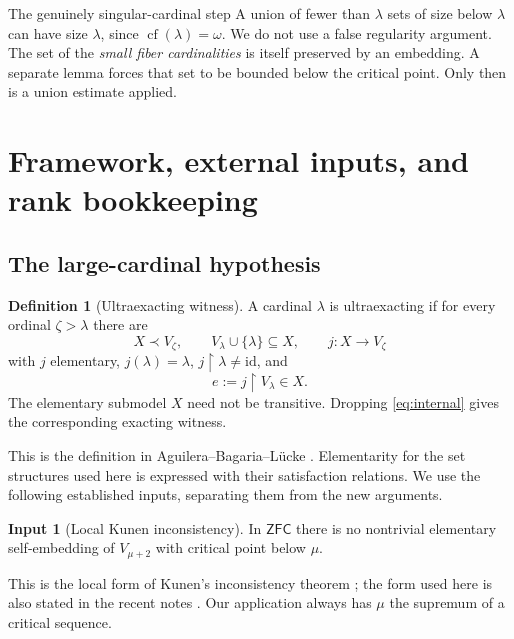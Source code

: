 \documentclass[11pt,letterpaper]{article}
\theoremstyle{definition}
\newtheorem{definition}{Definition}[section]
\newtheorem{inputthm}{Input}
\numberwithin{equation}{section}
\newcommand{\ZFC}{\mathsf{ZFC}}
\newcommand{\cf}{\operatorname{cf}}
\newcommand{\id}{\mathrm{id}}
\newcommand{\restr}{\mathbin{\upharpoonright}}
\begin{document}
\begin{assessment}{The genuinely singular-cardinal step}
A union of fewer than $\lambda$ sets of size below $\lambda$ can have size $\lambda$, since $\cf(\lambda)=\omega$. We do not use a false regularity argument. The set of the \emph{small fiber cardinalities} is itself preserved by an embedding. A separate lemma forces that set to be bounded below the critical point. Only then is a union estimate applied.
\end{assessment}

\section{Framework, external inputs, and rank bookkeeping}\label{sec:framework}

\subsection{The large-cardinal hypothesis}

\begin{definition}[Ultraexacting witness]\label{def:ultra}
A cardinal $\lambda$ is ultraexacting if for every ordinal $\zeta>\lambda$ there are
\[
 X\prec V_\zeta,\qquad V_\lambda\cup\{\lambda\}\subseteq X,
 \qquad j:X\longrightarrow V_\zeta
\]
with $j$ elementary, $j(\lambda)=\lambda$, $j\restr\lambda\ne\id$, and
\begin{equation}\label{eq:internal}
             e:=j\restr V_\lambda\in X.
\end{equation}
The elementary submodel $X$ need not be transitive. Dropping \eqref{eq:internal} gives the corresponding exacting witness.
\end{definition}

This is the definition in Aguilera--Bagaria--L\"ucke \cite[Definition 3.3]{ABL}. Elementarity for the set structures used here is expressed with their satisfaction relations. We use the following established inputs, separating them from the new arguments.

\begin{inputthm}[Local Kunen inconsistency]\label{in:kunen}
In $\ZFC$ there is no nontrivial elementary self-embedding of $V_{\mu+2}$ with critical point below $\mu$.
\end{inputthm}

This is the local form of Kunen's inconsistency theorem \cite{Kunen}; the form used here is also stated in the recent notes \cite[Theorem 1.1]{Goldberg2026}. Our application always has $\mu$ the supremum of a critical sequence.
\end{document}
